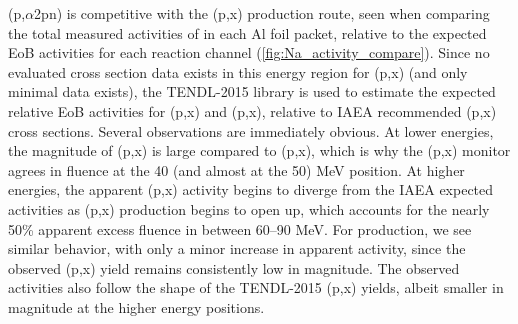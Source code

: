(p,$\alpha$2pn) 
is competitive with the (p,x) 
production route,
seen when comparing the total measured activities of   
in each Al foil packet, 
relative to the expected EoB activities for each reaction channel 
(\autoref{fig:Na_activity_compare}).
Since no evaluated  cross section data exists in this energy region  for  (p,x)  (and only minimal  data exists),  the TENDL-2015 library is used to estimate the expected relative EoB activities for (p,x) and (p,x), 
relative to IAEA recommended (p,x) cross sections.
Several observations are immediately obvious.
At lower energies, the magnitude of (p,x) is large compared to (p,x), which is why the (p,x) monitor agrees in fluence at the 40 (and almost at the 50) MeV position.  
At higher energies, the apparent (p,x) activity begins to diverge from the IAEA expected activities as     (p,x) production begins to open up,  which accounts for the nearly 50\% apparent excess fluence in  between 60--90 MeV.
For   production, we see  similar behavior, with only a minor increase in apparent  activity,  since the observed (p,x) yield remains consistently low in magnitude.
The observed  activities also follow the shape of the TENDL-2015 (p,x) yields, albeit smaller in magnitude at the higher energy positions.




